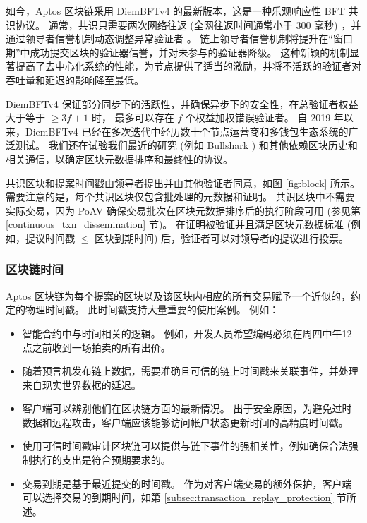 \documentclass{article}
\begin{document}
如今，Aptos 区块链采用 DiemBFTv4 \cite{diembft_v4} 的最新版本，这是一种乐观响应性 BFT 共识协议。 通常，共识只需要两次网络往返 (全网往返时间通常小于 300 毫秒) ，并通过领导者信誉机制动态调整异常验证者 \cite{be_aware}。 链上领导者信誉机制将提升在“窗口期”中成功提交区块的验证器信誉，并对未参与的验证器降级。 这种新颖的机制显著提高了去中心化系统的性能，为节点提供了适当的激励，并将不活跃的验证者对吞吐量和延迟的影响降至最低。

DiemBFTv4 保证部分同步下的活跃性，并确保异步下的安全性，在总验证者权益大于等于 $\geq 3f+1$ 时， 最多可以存在 $f$ 个权益加权错误验证者。 自 2019 年以来，DiemBFTv4 已经在多次迭代中经历数十个节点运营商和多钱包生态系统的广泛测试。 我们还在试验我们最近的研究 (例如 Bullshark \cite{bullshark}) 和其他依赖区块历史和相关通信，以确定区块元数据排序和最终性的协议。

共识区块和提案时间戳由领导者提出并由其他验证者同意，如图 \ref{fig:block} 所示。 需要注意的是，每个共识区块仅包含批处理的元数据和证明。 共识区块中不需要实际交易，因为 PoAV 确保交易批次在区块元数据排序后的执行阶段可用 (参见第 \ref{continuous_txn_dissemination} 节)。 在证明被验证并且满足区块元数据标准 (例如，提议时间戳 $\le$ 区块到期时间) 后，验证者可以对领导者的提议进行投票。

\subsubsection{区块链时间}
\label{subsubsec:blockchain_time}

Aptos 区块链为每个提案的区块以及该区块内相应的所有交易赋予一个近似的，约定的物理时间戳。 此时间戳支持大量重要的使用案例。 例如：

\begin{itemize}
\item 智能合约中与时间相关的逻辑。 例如，开发人员希望编码必须在周四中午12点之前收到一场拍卖的所有出价。
\item 随着预言机发布链上数据，需要准确且可信的链上时间戳来关联事件，并处理来自现实世界数据的延迟。

\item 客户端可以辨别他们在区块链方面的最新情况。 出于安全原因，为避免过时数据和远程攻击，客户端应该能够访问帐户状态更新时间的高精度时间戳。

\item 使用可信时间戳审计区块链可以提供与链下事件的强相关性，例如确保合法强制执行的支出是符合预期要求的。
\item 交易到期是基于最近提交的时间戳。 作为对客户端交易的额外保护，客户端可以选择交易的到期时间，如第 \ref{subsec:transaction_replay_protection} 节所述。

\end{itemize}
\end{document}
